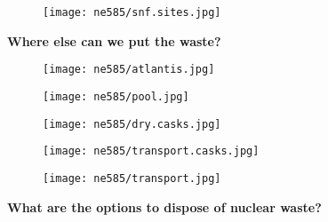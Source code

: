 \documentclass[aspectratio=1610,pdftex,dvipsnames,compress,xcolor={dvipsnames}]{beamer}
\begin{document}
\begin{frame}{}
    \begin{figure}
        \centering
        \texttt{[image: ne585/snf.sites.jpg]}
    \end{figure}
\end{frame}


\begin{frame}[plain]{}
    \centering\LARGE\textbf{Where else can we put the waste?}
\end{frame}


\addtocounter{framenumber}{-1} 
\begin{frame}{}
    \begin{figure}
        \centering
        \texttt{[image: ne585/atlantis.jpg]}
    \end{figure}
\end{frame}


\begin{frame}{}
    \begin{figure}
        \centering
        \texttt{[image: ne585/pool.jpg]}
    \end{figure}
\end{frame}


\begin{frame}{}
    \begin{figure}
        \centering
        \texttt{[image: ne585/dry.casks.jpg]}
    \end{figure}
\end{frame}


\begin{frame}{}
    \begin{figure}
        \centering
        \texttt{[image: ne585/transport.casks.jpg]}
    \end{figure}
\end{frame}


\begin{frame}{}
    \begin{figure}
        \centering
        \texttt{[image: ne585/transport.jpg]}
    \end{figure}
\end{frame}


\begin{frame}[plain]{}
    \centering\LARGE\textbf{What are the options to dispose of nuclear waste?}
\end{frame}
\end{document}
